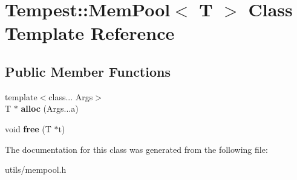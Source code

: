 \hypertarget{class_tempest_1_1_mem_pool}{\section{Tempest\+:\+:Mem\+Pool$<$ T $>$ Class Template Reference}
\label{class_tempest_1_1_mem_pool}
}
\subsection*{Public Member Functions}
\begin{DoxyCompactItemize}
\item 
\hypertarget{class_tempest_1_1_mem_pool_aae41d2faca85ce4a0d181833cc8bc595}{{\footnotesize template$<$class... Args$>$ }\\T $\ast$ {\bfseries alloc} (Args...\+a)}\label{class_tempest_1_1_mem_pool_aae41d2faca85ce4a0d181833cc8bc595}

\item 
\hypertarget{class_tempest_1_1_mem_pool_a9f00cccc3082be836460a305494eddb9}{void {\bfseries free} (T $\ast$t)}\label{class_tempest_1_1_mem_pool_a9f00cccc3082be836460a305494eddb9}

\end{DoxyCompactItemize}


The documentation for this class was generated from the following file\+:\begin{DoxyCompactItemize}
\item 
utils/mempool.\+h\end{DoxyCompactItemize}
